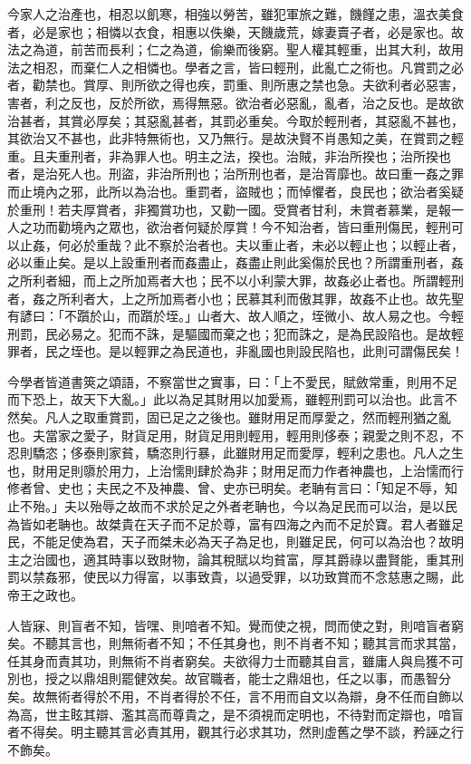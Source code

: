 \begin{pinyinscope}
今家人之治產也，相忍以飢寒，相強以勞苦，雖犯軍旅之難，饑饉之患，溫衣美食者，必是家也；相憐以衣食，相惠以佚樂，天饑歲荒，嫁妻賣子者，必是家也。故法之為道，前苦而長利；仁之為道，偷樂而後窮。聖人權其輕重，出其大利，故用法之相忍，而棄仁人之相憐也。學者之言，皆曰輕刑，此亂亡之術也。凡賞罰之必者，勸禁也。賞厚、則所欲之得也疾，罰重、則所惠之禁也急。夫欲利者必惡害，害者，利之反也，反於所欲，焉得無惡。欲治者必惡亂，亂者，治之反也。是故欲治甚者，其賞必厚矣；其惡亂甚者，其罰必重矣。今取於輕刑者，其惡亂不甚也，其欲治又不甚也，此非特無術也，又乃無行。是故決賢不肖愚知之美，在賞罰之輕重。且夫重刑者，非為罪人也。明主之法，揆也。治賊，非治所揆也；治所揆也者，是治死人也。刑盜，非治所刑也；治所刑也者，是治胥靡也。故曰重一姦之罪而止境內之邪，此所以為治也。重罰者，盜賊也；而悼懼者，良民也；欲治者奚疑於重刑！若夫厚賞者，非獨賞功也，又勸一國。受賞者甘利，未賞者慕業，是報一人之功而勸境內之眾也，欲治者何疑於厚賞！今不知治者，皆曰重刑傷民，輕刑可以止姦，何必於重哉？此不察於治者也。夫以重止者，未必以輕止也；以輕止者，必以重止矣。是以上設重刑者而姦盡止，姦盡止則此奚傷於民也？所謂重刑者，姦之所利者細，而上之所加焉者大也；民不以小利蒙大罪，故姦必止者也。所謂輕刑者，姦之所利者大，上之所加焉者小也；民慕其利而傲其罪，故姦不止也。故先聖有諺曰：「不躓於山，而躓於垤。」山者大、故人順之，垤微小、故人易之也。今輕刑罰，民必易之。犯而不誅，是驅國而棄之也；犯而誅之，是為民設陷也。是故輕罪者，民之垤也。是以輕罪之為民道也，非亂國也則設民陷也，此則可謂傷民矣！

今學者皆道書筴之頌語，不察當世之實事，曰：「上不愛民，賦斂常重，則用不足而下恐上，故天下大亂。」此以為足其財用以加愛焉，雖輕刑罰可以治也。此言不然矣。凡人之取重賞罰，固已足之之後也。雖財用足而厚愛之，然而輕刑猶之亂也。夫當家之愛子，財貨足用，財貨足用則輕用，輕用則侈泰；親愛之則不忍，不忍則驕恣；侈泰則家貧，驕恣則行暴，此雖財用足而愛厚，輕利之患也。凡人之生也，財用足則隳於用力，上治懦則肆於為非；財用足而力作者神農也，上治懦而行修者曾、史也；夫民之不及神農、曾、史亦已明矣。老聃有言曰：「知足不辱，知止不殆。」夫以殆辱之故而不求於足之外者老聃也，今以為足民而可以治，是以民為皆如老聃也。故桀貴在天子而不足於尊，富有四海之內而不足於寶。君人者雖足民，不能足使為君，天子而桀未必為天子為足也，則雖足民，何可以為治也？故明主之治國也，適其時事以致財物，論其稅賦以均貧富，厚其爵祿以盡賢能，重其刑罰以禁姦邪，使民以力得富，以事致貴，以過受罪，以功致賞而不念慈惠之賜，此帝王之政也。

人皆寐、則盲者不知，皆嘿、則喑者不知。覺而使之視，問而使之對，則喑盲者窮矣。不聽其言也，則無術者不知；不任其身也，則不肖者不知；聽其言而求其當，任其身而責其功，則無術不肖者窮矣。夫欲得力士而聽其自言，雖庸人與烏獲不可別也，授之以鼎俎則罷健效矣。故官職者，能士之鼎俎也，任之以事，而愚智分矣。故無術者得於不用，不肖者得於不任，言不用而自文以為辯，身不任而自飾以為高，世主眩其辯、濫其高而尊貴之，是不須視而定明也，不待對而定辯也，喑盲者不得矣。明主聽其言必責其用，觀其行必求其功，然則虛舊之學不談，矜誣之行不飾矣。


\end{pinyinscope}